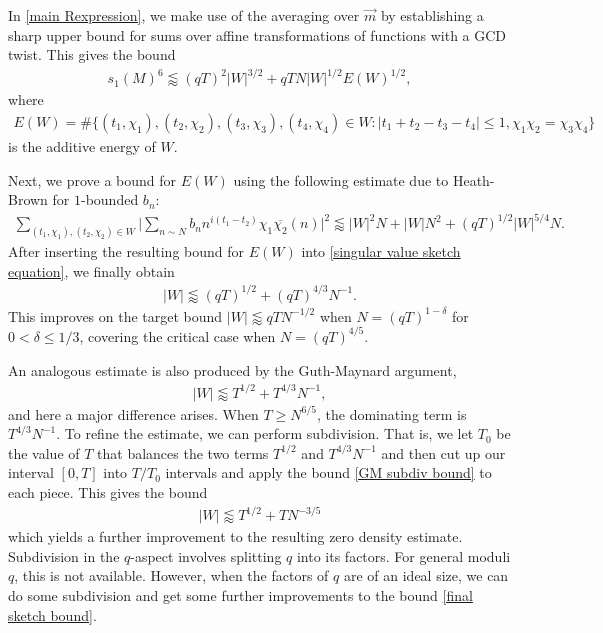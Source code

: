 \documentclass[12pt]{amsart}
\theoremstyle{definition}
\theoremstyle{plain}
\theoremstyle{remark}
\numberwithin{equation}{section}
\numberwithin{theorem}{section}
\numberwithin{equation}{section}
\begin{document}
	In \eqref{main Rexpression}, we make use of the averaging over $\overrightarrow{m}$ by establishing a sharp upper bound for sums over affine transformations of functions with a GCD twist. This gives the bound
	\begin{align}\label{singular value sketch equation}
		s_1(M)^6 \lessapprox (qT)^2|W|^{3/2}+qTN|W|^{1/2}E(W)^{1/2},
	\end{align}
	where 
	\begin{align*}
		E(W) = \#\{(t_1,\chi_1),(t_2,\chi_2),(t_3,\chi_3),(t_4,\chi_4) \in W: |t_1+t_2-t_3-t_4| \leq 1, \chi_1\chi_2=\chi_3\chi_4\}
	\end{align*}
	is the additive energy of $W$.
	
	Next, we prove a bound for $E(W)$ using the following estimate due to Heath-Brown for $1$-bounded $b_n$:
	\begin{align*}
		\sum_{(t_1,\chi_1),(t_2,\chi_2) \in W} \bigg| \sum_{n \sim N} b_n n^{i(t_1-t_2)}\chi_1 \overline{\chi_2}(n) \bigg|^2 \lessapprox|W|^2N+|W|N^2 + (qT)^{1/2}|W|^{5/4}N. 
	\end{align*}
	After inserting the resulting bound for $E(W)$ into \eqref{singular value sketch equation}, we finally obtain
	\begin{align}\label{final sketch bound}
		|W| \lessapprox (qT)^{1/2}+(qT)^{4/3}N^{-1}. 
	\end{align}
	This improves on the target bound $|W|\lessapprox qTN^{-1/2}$ when
	$N=(qT)^{1-\delta}$ for $0< \delta \leq 1/3$, covering the critical case when $N=(qT)^{4/5}$.
	
	An analogous estimate is also produced by the Guth-Maynard argument,
	\begin{align}
		|W| \lessapprox T^{1/2}+T^{4/3}N^{-1}, \label{GM subdiv bound}
	\end{align}
	and here a major difference arises. When $T \geq N^{6/5}$, the dominating term is $T^{4/3}N^{-1}$. To refine the estimate, we can perform subdivision. That is, we let $T_0$ be the value of $T$ that balances the two terms $T^{1/2}$ and $T^{4/3}N^{-1}$ and then cut up our interval $[0,T]$ into $T/T_0$ intervals and apply the bound \eqref{GM subdiv bound} to each piece. This gives the bound
	\begin{align*}
		|W| \lessapprox T^{1/2}+ TN^{-3/5}
	\end{align*}
	which yields a further improvement to the resulting zero density estimate. Subdivision in the $q$-aspect involves splitting $q$ into its factors. For general moduli $q$, this is not available. However, when the factors of $q$ are of an ideal size, we can do some subdivision and get some further improvements to the bound \eqref{final sketch bound}.
	
\end{document}
